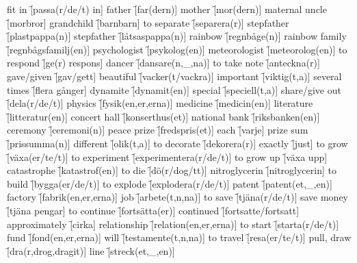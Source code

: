 \begin{questions}
\begin{multicols}{2}
        \question fit in \f[passa(r/de/t) in]
        \question father \f[far(dern)]
        \question mother \f[mor(dern)]
        \question maternal uncle \f[morbror]
        \question grandchild \f[barnbarn]
        \question to separate \f[separera(r)]
        \question stepfather \f[plastpappa(n)]
        \question stepfather \f[låtsaspappa(n)]
        \question rainbow \f[regnbåge(n)]
        \question rainbow family \f[regnbågsfamilj(en)]
        \question psychologist \f[psykolog(en)]
        \question meteorologist \f[meteorolog(en)]
        \question to respond \f[ge(r) respons]
        \question dancer \f[dansare(n,\_,na)]
        \question to take note \f[anteckna(r)]
        \question gave/given \f[gav/gett]
        \question beautiful \f[vacker(t/vackra)]
        \question important \f[viktig(t,a)]
        \question several times \f[flera gånger]
        \question dynamite \f[dynamit(en)]
        \question special \f[speciell(t,a)]
        \question share/give out \f[dela(r/de/t)]
        \question physics \f[fysik(en,er,erna)]
        \question medicine \f[medicin(en)]
        \question literature \f[litteratur(en)]
        \question concert hall \f[konserthus(et)]
        \question national bank \f[riksbanken(en)]
        \question ceremony \f[ceremoni(n)]
        \question peace prize \f[fredspris(et)]
        \question each \f[varje]
        \question prize sum \f[prissumma(n)]
        \question different \f[olik(t,a)]
        \question to decorate \f[dekorera(r)]
        \question exactly \f[just]
        \question to grow \f[växa(er/te/t)]
        \question to experiment \f[experimentera(r/de/t)]
        \question to grow up \f[växa upp]
        \question catastrophe \f[katastrof(en)]
        \question to die \f[dö(r/dog/tt)]
        \question nitroglycerin \f[nitroglycerin]
        \question to build \f[bygga(er/de/t)]
        \question to explode \f[explodera(r/de/t)]
        \question patent \f[patent(et,\_,en)]
        \question factory \f[fabrik(en,er,erna)]
        \question job \f[arbete(t,n,na)]
        \question to save \f[tjäna(r/de/t)]
        \question save money \f[tjäna pengar]
        \question to continue \f[fortsätta(er)]
        \question continued \f[fortsatte/fortsatt]
        \question approximately \f[cirka]
        \question relationship \f[relation(en,er,erna)]
        \question to start \f[starta(r/de/t)]
        \question fund \f[fond(en,er,erna)]
        \question will \f[testamente(t,n,na)]
        \question to travel \f[resa(er/te/t)]
        \question pull, draw \f[dra(r,drog,dragit)]
        \question line \f[streck(et,\_,en)]

\end{multicols}
\end{questions}
